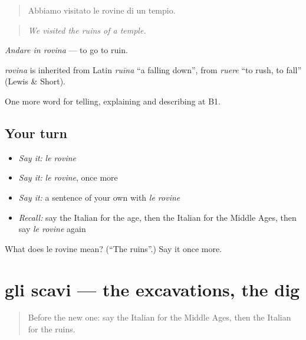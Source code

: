 \begin{quote}
Abbiamo visitato le rovine di un tempio.
\end{quote}

\begin{quote}
\emph{We visited the ruins of a temple.}
\end{quote}

\emph{Andare in rovina} — to go to ruin.

\begin{cousinweb}
\emph{rovina} is inherited from Latin \emph{ruīna} \textquotedblleft{}a falling down\textquotedblright{}, from \emph{ruere} \textquotedblleft{}to rush, to fall\textquotedblright{} (Lewis \& Short).
\end{cousinweb}

\begin{grammarlens}[title={What you've built}]
One more word for telling, explaining and describing at B1.
\end{grammarlens}

\subsection*{Your turn}
\begin{itemize}
\raggedright
  \item \emph{Say it:} \emph{le rovine}
  \item \emph{Say it:} \emph{le rovine}, once more
  \item \emph{Say it:} a sentence of your own with \emph{le rovine}
  \item \emph{Recall:} say the Italian for the age, then the Italian for the Middle Ages, then say \emph{le rovine} again
\end{itemize}

\begin{tcolorbox}[breakable,colback=teal!4,colframe=teal!35!black,title={Before you move on}]
What does le rovine mean? (\textquotedblleft{}The ruins\textquotedblright{}.) Say it once more.
\end{tcolorbox}
\section[gli scavi]{gli scavi — the excavations, the dig}

\label{lesson:IT-C330-scavi}



\begin{quote}
Before the new one: say the Italian for the Middle Ages, then the Italian for the ruins.
\end{quote}

